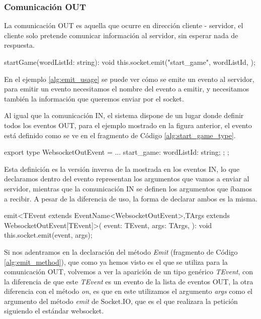 \subsubsection{Comunicación OUT}
La comunicación OUT es aquella que ocurre en dirección cliente - servidor, el cliente solo pretende comunicar información al servidor, sin esperar nada de respuesta.

\begin{mytypescript}[float={!h},caption={Ejemplo de uso del método \textit{emit}.},label={alg:emit_usage}]
	startGame(wordListId: string): void {
		this.socket.emit("start_game", {
			wordListId,
		});
	}
\end{mytypescript}

En el ejemplo \ref{alg:emit_usage} se puede ver cómo se emite un evento al servidor, para emitir un evento necesitamos el nombre del evento a emitir, y necesitamos también la información que queremos enviar por el socket.

Al igual que la comunicación IN, el sistema dispone de un lugar donde definir todos los eventos OUT, para el ejemplo mostrado en la figura anterior, el evento está definido como se ve en el fragmento de Código \ref{alg:start_game_type}.

\begin{mytypescript}[float={!h},caption={Ejemplo de declaración de la comunicación OUT.},label={alg:start_game_type}]
	export type WebsocketOutEvent = {
		...
		start_game: {
			wordListId: string;
		};
	};
\end{mytypescript}

Esta definición es la versión inversa de la mostrada en los eventos IN, lo que declaramos dentro del evento representan los argumentos que vamos a enviar al servidor, mientras que la comunicación IN se definen los argumentos que íbamos a recibir. A pesar de la diferencia de uso, la forma de declarar ambos es la misma.

\begin{mytypescript}[float={!h},caption={Declaración del método \textit{emit}.},label={alg:emit_method}]
	emit<TEvent extends EventName<WebsocketOutEvent>,TArgs extends WebsocketOutEvent[TEvent]>(
	event: TEvent,
	args: TArgs,
	): void {
		this.socket.emit(event, args);
	}
\end{mytypescript}

Si nos adentramos en la declaración del método \textit{Emit} (fragmento de Código \ref{alg:emit_method}), que como ya hemos visto es el que se utiliza para la comunicación OUT, volvemos a ver la aparición de un tipo genérico \textit{TEvent}, con la diferencia de que este \textit{TEvent} es un evento de la lista de eventos OUT, la otra diferencia con el método \textit{on}, es que en este utilizamos el argumento \textit{args} como el argumento del método \textit{emit} de Socket.IO, que es el que realizara la petición siguiendo el estándar websocket.

